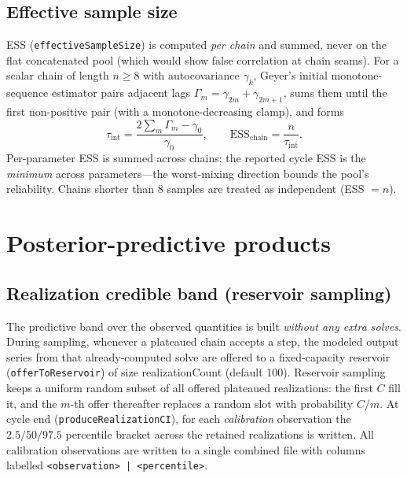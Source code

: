\documentclass[11pt]{article}
\newcommand{\code}[1]{\texttt{\small #1}}
\newcommand{\param}[1]{\textsf{#1}}
\begin{document}
\subsection{Effective sample size}
ESS (\code{effectiveSampleSize}) is computed \emph{per chain} and summed,
never on the flat concatenated pool (which would show false correlation
at chain seams). For a scalar chain of length $n\ge 8$ with autocovariance
$\gamma_k$, Geyer's initial monotone-sequence estimator pairs adjacent
lags $\Gamma_m=\gamma_{2m}+\gamma_{2m+1}$, sums them until the first
non-positive pair (with a monotone-decreasing clamp), and forms
\begin{equation}
  \tau_{\text{int}} = \frac{2\sum_m \Gamma_m - \gamma_0}{\gamma_0},
  \qquad
  \mathrm{ESS}_{\text{chain}} = \frac{n}{\tau_{\text{int}}}.
\end{equation}
Per-parameter ESS is summed across chains; the reported cycle ESS is the
\emph{minimum} across parameters---the worst-mixing direction bounds the
pool's reliability. Chains shorter than $8$ samples are treated as
independent (ESS $=n$).

\section{Posterior-predictive products}

\subsection{Realization credible band (reservoir sampling)}
The predictive band over the observed quantities is built \emph{without
any extra solves}. During sampling, whenever a plateaued chain accepts a
step, the modeled output series from that already-computed solve are
offered to a fixed-capacity reservoir (\code{offerToReservoir}) of size
\param{realizationCount} (default $100$). Reservoir sampling keeps a
uniform random subset of all offered plateaued realizations: the first
$C$ fill it, and the $m$-th offer thereafter replaces a random slot with
probability $C/m$. At cycle end (\code{produceRealizationCI}), for each
\emph{calibration} observation the $2.5/50/97.5$ percentile bracket across
the retained realizations is written. All calibration observations are
written to a single combined file with columns labelled
\code{<observation> | <percentile>}.
\end{document}
